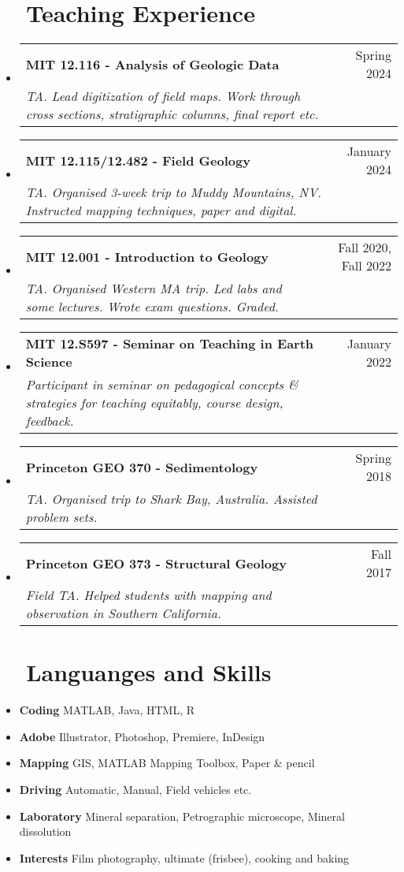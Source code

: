\documentclass[letterpaper,20pt]{article}
\makeatletter
\newcommand{\resumeItem}[2]{
  \item\normalsize{
    \textbf{#1}{ #2 \vspace{-2pt}}
  }
}
\newcommand{\resumeSubheading}[4]{
  \vspace{-1pt}\item
    \begin{tabular*}{0.97\textwidth}{l@{\extracolsep{\fill}}r}
      \textbf{#1} & #2 \\
      \textit{#3} & \textit{#4} \\
    \end{tabular*}\vspace{-5pt}
}
\newcommand{\resumeSubItem}[2]{\resumeItem{#1}{#2}\vspace{-3pt}}
\newcommand{\resumeSubHeadingListStart}{\begin{itemize}[leftmargin=*]}
\newcommand{\resumeSubHeadingListEnd}{\end{itemize}}
\makeatother
\begin{document}
\vspace{3pt}
\section{~~Teaching Experience}
  \resumeSubHeadingListStart
    \resumeSubheading
    {MIT 12.116 - Analysis of Geologic Data}{Spring 2024}
    {TA. Lead digitization of field maps. Work through cross sections, stratigraphic columns, final report etc.}{} 
    \resumeSubheading
    {MIT 12.115/12.482 - Field Geology}{January 2024}
    {TA. Organised 3-week trip to Muddy Mountains, NV. Instructed mapping techniques, paper and digital.}{} 
    \resumeSubheading
    {MIT 12.001 - Introduction to Geology}{Fall 2020, Fall 2022}
    {TA. Organised Western MA trip. Led labs and some lectures. Wrote exam questions. Graded.}{} 
    \resumeSubheading
    {MIT 12.S597 - Seminar on Teaching in Earth Science}{January 2022}
    {Participant in seminar on pedagogical concepts \& strategies for teaching equitably, course design, feedback.}{}
  \resumeSubheading
    {Princeton GEO 370 - Sedimentology}{Spring 2018}
    {TA. Organised trip to Shark Bay, Australia. Assisted problem sets.}{} 
  \resumeSubheading
    {Princeton GEO 373 - Structural Geology}{Fall 2017}
    {Field TA. Helped students with mapping and observation in Southern California.}{} 
    \resumeSubHeadingListEnd


\vspace{3pt}
\section{~~Languanges and Skills}
  \resumeSubHeadingListStart
    \resumeSubItem{Coding}{MATLAB, Java, HTML, R}
    \resumeSubItem{Adobe}{Illustrator, Photoshop, Premiere, InDesign}
    \resumeSubItem{Mapping}{GIS, MATLAB Mapping Toolbox, Paper \& pencil}
    \resumeSubItem{Driving}{Automatic, Manual, Field vehicles etc.}
    \resumeSubItem{Laboratory}{Mineral separation, Petrographic microscope, Mineral dissolution}
    \resumeSubItem{Interests}{Film photography, ultimate (frisbee), cooking and baking}
    \resumeSubHeadingListEnd
    
\vspace{3pt}
\end{document}
